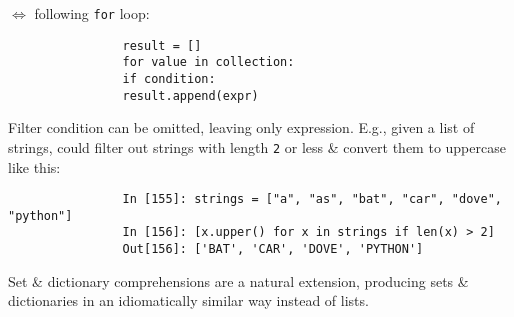 \documentclass{article}
\begin{document}
\begin{itemize}
\begin{itemize}
\begin{itemize}
\begin{verbatim}
			\end{verbatim}
			$\Leftrightarrow$ following {\tt for} loop:
			\begin{verbatim}
				result = []
				for value in collection:
				if condition:
				result.append(expr)
			\end{verbatim}
			Filter condition can be omitted, leaving only expression. E.g., given a list of strings, could filter out strings with length {\tt 2} or less \& convert them to uppercase like this:
			\begin{verbatim}
				In [155]: strings = ["a", "as", "bat", "car", "dove", "python"]
				In [156]: [x.upper() for x in strings if len(x) > 2]
				Out[156]: ['BAT', 'CAR', 'DOVE', 'PYTHON']
			\end{verbatim}
			Set \& dictionary comprehensions are a natural extension, producing sets \& dictionaries in an idiomatically similar way instead of lists.
			

\end{itemize}
\end{itemize}
\end{itemize}
\end{document}
